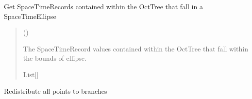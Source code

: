 \documentclass[letterpaper,10pt,english]{sphinxmanual}
\begin{document}
\begin{fulllineitems}
\begin{fulllineitems}
\label{\detokenize{octtree:geotrees.octtree.OctTree.query_ellipse}}
\pysigstartsignatures
\pysiglinewithargsret
{}
{\sphinxparamcomma {}}
{}
\pysigstopsignatures
\sphinxAtStartPar
Get SpaceTimeRecords contained within the OctTree that fall in a
SpaceTimeEllipse
\begin{quote}\begin{description}
\sphinxAtStartPar
{} ({\hyperref[\detokenize{shape:geotrees.shape.SpaceTimeEllipse}]{}})

\sphinxAtStartPar
The SpaceTimeRecord values contained within the OctTree that fall
within the bounds of ellipse.

\sphinxAtStartPar
List{[}{\hyperref[\detokenize{record:geotrees.record.SpaceTimeRecord}]{}}{]}

\end{description}\end{quote}

\end{fulllineitems}


\begin{fulllineitems}
\label{\detokenize{octtree:geotrees.octtree.OctTree.redistribute_to_branches}}
\pysigstartsignatures
\pysiglinewithargsret
{}
{}
{}
\pysigstopsignatures
\sphinxAtStartPar
Redistribute all points to branches
\begin{quote}\begin{description}
\sphinxAtStartPar
{}

\end{description}\end{quote}

\end{fulllineitems}



\end{fulllineitems}
\end{document}
